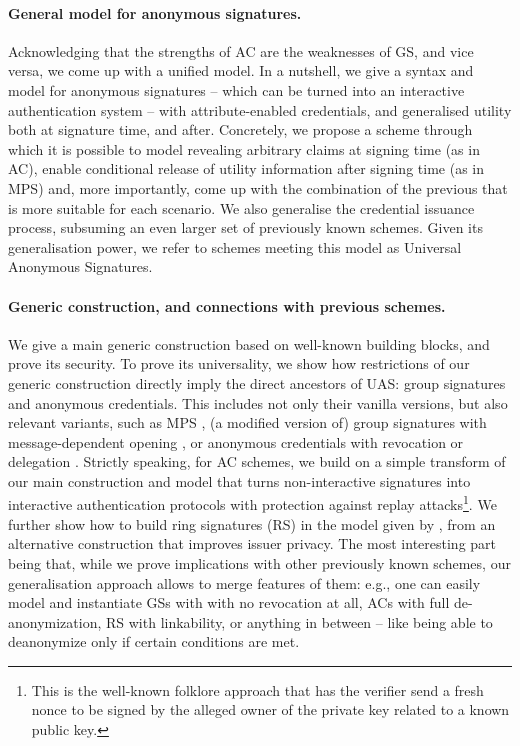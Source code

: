 \paragraph{General model for anonymous signatures.} %
Acknowledging that the strengths of AC are the weaknesses of GS, and vice versa,
we come up with a unified model. In a nutshell, we give a syntax and model for
anonymous signatures -- which can be turned into an interactive authentication
system -- with attribute-enabled credentials, and generalised utility both at
signature time, and after. Concretely, we propose a scheme
through which it is possible to model revealing arbitrary claims at signing time
(as in AC), enable conditional release of utility information after signing time
(as in MPS) and, more importantly, come up with the combination of the previous
that is more suitable for each scenario. We also generalise the credential
issuance process, subsuming an even larger set of previously known schemes.
Given its generalisation power, we refer to schemes meeting this model as
Universal Anonymous Signatures.

\paragraph{Generic construction, and connections with previous schemes.} %
We give a main generic construction based on well-known building blocks, and
prove its security. To prove its universality, we show how restrictions of our
generic construction directly imply the direct ancestors of UAS: group
signatures and anonymous credentials. This includes not only their vanilla
versions, but also relevant variants, such as MPS \cite{ngsy22}, (a modified
version of) group signatures with message-dependent opening \cite{seh+12}, or
anonymous credentials with revocation \cite{cks10} or delegation \cite{bcc+09}.
Strictly speaking, for AC schemes, we build on a simple transform of our main
construction and model that turns non-interactive signatures into interactive
authentication protocols with protection against replay attacks\footnote{This is
  the well-known folklore approach that has the verifier send a fresh nonce to
  be signed by the alleged owner of the private key related to a known
  public key.}. We further show how to
build ring signatures (RS) in the model given by \cite{bkm06}, from an
alternative construction that improves issuer privacy.
%
The most interesting part being that, while we prove implications with other
previously known schemes, our generalisation approach allows to merge features
of them: e.g., one can easily model and instantiate GSs with with no revocation
at all, ACs with full de-anonymization, RS with linkability, or anything in
between -- like being able to deanonymize only if certain conditions are met.

